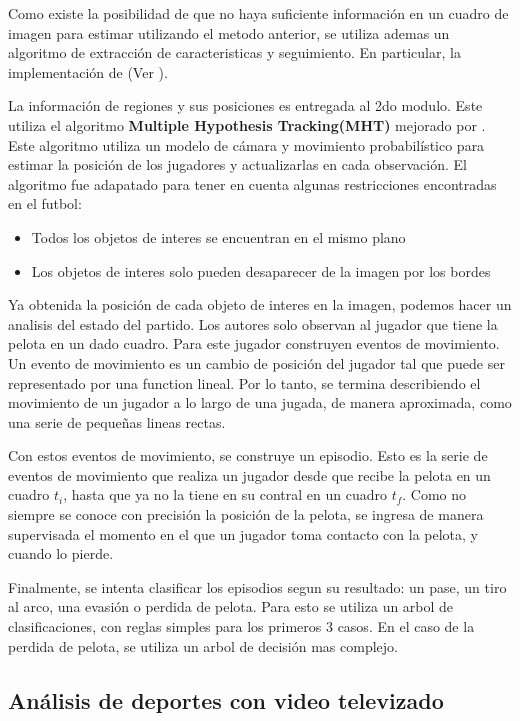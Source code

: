 \documentclass[a4paper,10pt]{article}
\begin{document}
Como existe la posibilidad de que no haya suficiente información en un cuadro de imagen para estimar
utilizando el metodo anterior, se utiliza ademas un algoritmo de extracción de caracteristicas y seguimiento.
En particular, la implementación de \citeauthor{shi-tomasi-tracking} (Ver \cite{shi-tomasi-tracking}).

La información de regiones y sus posiciones es entregada al 2do modulo.
Este utiliza el algoritmo \textbf{Multiple Hypothesis Tracking(MHT)} \cite{MHT-1, MHT-2} mejorado por
\citeauthor*{Schmitt-1}\cite{Schmitt-2}. Este algoritmo utiliza un modelo de cámara y movimiento 
probabilístico para estimar la posición de los jugadores y actualizarlas en cada observación.
El algoritmo fue adapatado para tener en cuenta algunas restricciones encontradas en el futbol:
\begin{itemize}
\item Todos los objetos de interes se encuentran en el mismo plano
\item Los objetos de interes solo pueden desaparecer de la imagen por los bordes
\end{itemize}

Ya obtenida la posición de cada objeto de interes en la imagen, podemos hacer un analisis del estado del partido.
Los autores solo observan al jugador que tiene la pelota en un dado cuadro.
Para este jugador construyen eventos de movimiento. Un evento de movimiento es un cambio de posición del jugador
tal que puede ser representado por una function lineal. Por lo tanto, se termina describiendo el movimiento de un
jugador a lo largo de una jugada, de manera aproximada, como una serie de pequeñas lineas rectas.

Con estos eventos de movimiento, se construye un episodio. Esto es la serie de eventos de movimiento que realiza
un jugador desde que recibe la pelota en un cuadro $t_i$, hasta que ya no la tiene en su contral en un cuadro $t_f$.
Como no siempre se conoce con precisión la posición de la pelota, se ingresa de manera supervisada el momento en el
que un jugador toma contacto con la pelota, y cuando lo pierde.

Finalmente, se intenta clasificar los episodios segun su resultado: un pase, un tiro al arco, una evasión o perdida de pelota.
Para esto se utiliza un arbol de clasificaciones, con reglas simples para los primeros 3 casos.
En el caso de la perdida de pelota, se utiliza un arbol de decisión mas complejo.

\subsection{Análisis de deportes con video televizado}
\label{sec:tv-video}
\end{document}
